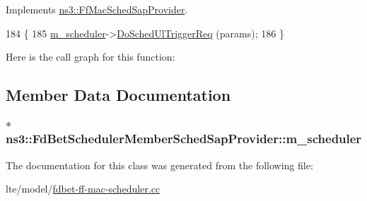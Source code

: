 Implements \hyperlink{classns3_1_1FfMacSchedSapProvider_a7bd978ea17a587a1626ef684be006c04}{ns3\+::\+Ff\+Mac\+Sched\+Sap\+Provider}.


\begin{DoxyCode}
184 \{
185   \hyperlink{classns3_1_1FdBetSchedulerMemberSchedSapProvider_a292f5d9506cae338100d35a1ddb4cf94}{m\_scheduler}->\hyperlink{classns3_1_1FdBetFfMacScheduler_a7674bb498c32390d6317d162210ccac8}{DoSchedUlTriggerReq} (params);
186 \}
\end{DoxyCode}


Here is the call graph for this function\+:




\subsection{Member Data Documentation}
\subsubsection[{\texorpdfstring{m\+\_\+scheduler}{m_scheduler}}]{$\ast$ ns3\+::\+Fd\+Bet\+Scheduler\+Member\+Sched\+Sap\+Provider\+::m\+\_\+scheduler\hspace{0.3cm}{\ttfamily [private]}}\hypertarget{classns3_1_1FdBetSchedulerMemberSchedSapProvider_a292f5d9506cae338100d35a1ddb4cf94}{}\label{classns3_1_1FdBetSchedulerMemberSchedSapProvider_a292f5d9506cae338100d35a1ddb4cf94}


The documentation for this class was generated from the following file\+:\begin{DoxyCompactItemize}
\item 
lte/model/\hyperlink{fdbet-ff-mac-scheduler_8cc}{fdbet-\/ff-\/mac-\/scheduler.\+cc}\end{DoxyCompactItemize}
